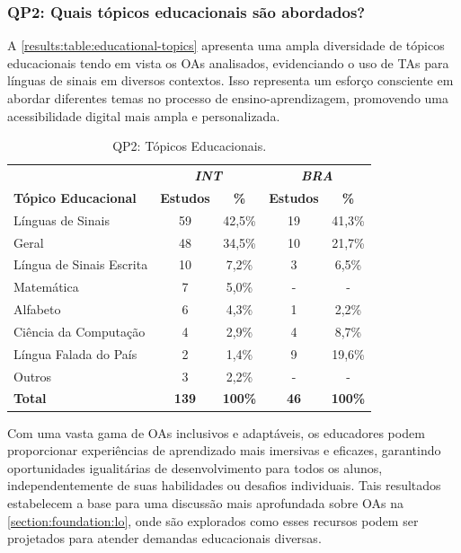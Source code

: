 \subsubsection{QP2: Quais tópicos educacionais são abordados?}

A \autoref{results:table:educational-topics} apresenta uma ampla diversidade de tópicos educacionais tendo em vista os OAs analisados, evidenciando o uso de TAs para línguas de sinais em diversos contextos. Isso representa um esforço consciente em abordar diferentes temas no processo de ensino-aprendizagem, promovendo uma acessibilidade digital mais ampla e personalizada. 

\begin{table}[htb]
\caption{QP2: Tópicos Educacionais.}
\label{results:table:educational-topics}
\centering
\begin{tabular}{l|cc|cc} \hline
 & \multicolumn{2}{c|}{\textit{\textbf{INT}}} & \multicolumn{2}{c}{\textit{\textbf{BRA}}} \\ \cline{2-5} 
\textbf{Tópico Educacional} & \textbf{Estudos} & \textbf{\%} & \textbf{Estudos} & \textbf{\%} \\ \hline
Línguas de Sinais & 59 & 42,5\% & 19 & 41,3\% \\
Geral & 48 & 34,5\% & 10 & 21,7\% \\
Língua de Sinais Escrita & 10 & 7,2\% & 3 & 6,5\% \\
Matemática & 7 & 5,0\% & - & - \\
Alfabeto & 6 & 4,3\% & 1 & 2,2\% \\
Ciência da Computação & 4 & 2,9\% & 4 & 8,7\% \\
Língua Falada do País & 2 & 1,4\% & 9 & 19,6\% \\
Outros & 3 & 2,2\% & - & - \\ \hline
\textbf{Total} & \textbf{139} & \textbf{100\%} & \textbf{46} & \textbf{100\%} \\ \hline
\end{tabular}
\end{table}

Com uma vasta gama de OAs inclusivos e adaptáveis, os educadores podem proporcionar experiências de aprendizado mais imersivas e eficazes, garantindo oportunidades igualitárias de desenvolvimento para todos os alunos, independentemente de suas habilidades ou desafios individuais. Tais resultados estabelecem a base para uma discussão mais aprofundada sobre OAs na \autoref{section:foundation:lo}, onde são explorados como esses recursos podem ser projetados para atender demandas educacionais diversas.

